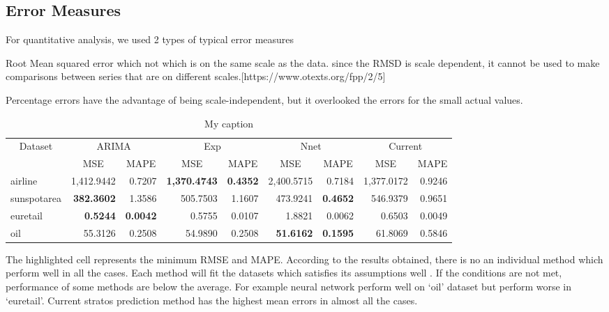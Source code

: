
\subsection{Error Measures}

For quantitative analysis, we used 2 types of  typical error measures 

Root Mean squared error which  not which is on the same scale as the data. since the RMSD is scale dependent, it cannot be used to make comparisons between series that are on different scales.[https://www.otexts.org/fpp/2/5]

Percentage errors have the advantage of being scale-independent, but it overlooked the errors for the small actual values.

\begin{table}[]
\centering
\caption{My caption}
\begin{tabular}{|l|r|r|r|r|r|r|r|r|}
\hline
\multicolumn{1}{|c|}{\multirow{2}{*}{Dataset}} & \multicolumn{2}{c|}{ARIMA} & \multicolumn{2}{c|}{Exp} & \multicolumn{2}{c|}{Nnet} & \multicolumn{2}{c|}{Current} \\ \cline{2-9} 
\multicolumn{1}{|c|}{} & \multicolumn{1}{c|}{MSE} & \multicolumn{1}{c|}{MAPE} & \multicolumn{1}{c|}{MSE} & \multicolumn{1}{c|}{MAPE} & \multicolumn{1}{c|}{MSE} & \multicolumn{1}{c|}{MAPE} & \multicolumn{1}{c|}{MSE} & \multicolumn{1}{c|}{MAPE} \\ \hline
airline & 1,412.9442 & 0.7207 & \textbf{1,370.4743} & \textbf{0.4352} & 2,400.5715 & 0.7184 & 1,377.0172 & 0.9246 \\ \hline
sunspotarea & \textbf{382.3602} & 1.3586 & 505.7503 & 1.1607 & 473.9241 & \textbf{0.4652} & 546.9379 & 0.9651 \\ \hline
euretail & \textbf{0.5244} & \textbf{0.0042} & 0.5755 & 0.0107 & 1.8821 & 0.0062 & 0.6503 & 0.0049 \\ \hline
oil & 55.3126 & 0.2508 & 54.9890 & 0.2508 & \textbf{51.6162} & \textbf{0.1595} & 61.8069 & 0.5846 \\ \hline
\end{tabular}
\end{table}


The highlighted cell represents the minimum RMSE and MAPE. According to the results obtained, there is no an individual method which perform well in all the cases. Each method will fit the datasets which satisfies its assumptions well . If the conditions are not met, performance of some methods are below the average. For example neural network perform well on ‘oil’ dataset but perform worse in ‘euretail’.  Current stratos prediction method has the highest mean errors in almost all the cases.

